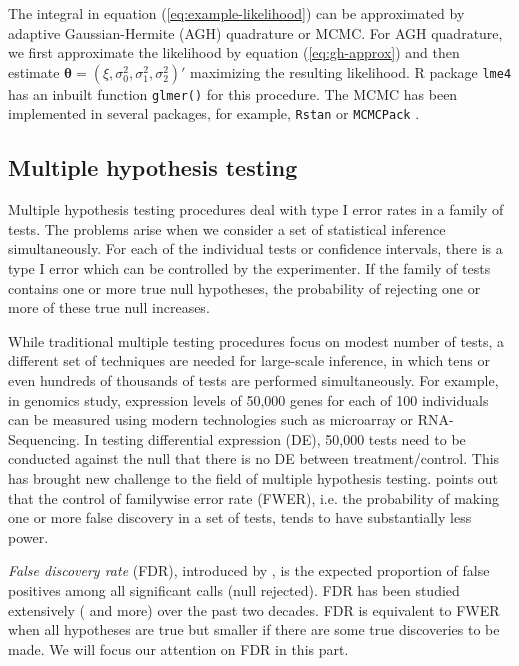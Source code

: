 The integral in equation (\ref{eq:example-likelihood}) can be approximated by adaptive
Gaussian-Hermite (AGH) quadrature or MCMC. For AGH quadrature, we first approximate the likelihood
by equation (\ref{eq:gh-approx}) and then estimate $\bm\theta = (\xi, \sigma_0^2, \sigma_1^2,
\sigma_2^2)'$ maximizing the resulting likelihood. R package \verb"lme4" \citep{bates2012lme4} has
an inbuilt function \verb"glmer()" for this procedure. The MCMC has been implemented in several
packages, for example, \verb|Rstan| \citep{Rstan} or \verb|MCMCPack| \citep{martin2011mcmcpack}. 

\subsection{Multiple hypothesis testing}
Multiple hypothesis testing procedures deal with type I error rates in a family of tests. The
problems arise when we consider a set of statistical inference simultaneously.  For each of the
individual tests or confidence intervals, there is a type I error which can be controlled by the
experimenter.  If the family of tests contains one or more true null hypotheses, the probability of
rejecting one or more of these true null increases. 

While traditional multiple testing procedures focus on modest number of tests, a different set of
techniques are needed for large-scale inference, in which tens or even hundreds of thousands of
tests are performed simultaneously. For example, in genomics study, expression levels of 50,000
genes for each of 100 individuals can be measured using modern technologies such as microarray or
RNA-Sequencing. In testing differential expression (DE), 50,000 tests need to be conducted against
the null that there is no DE between treatment/control. This has brought new challenge to the field
of multiple hypothesis testing. \citet{benjamini1995controlling} points out that the control of
familywise error rate (FWER), i.e. the probability of making one or more false discovery in a set
of
tests, tends to have substantially less power. 

\textit{False discovery rate} (FDR), introduced by \citet{benjamini1995controlling}, is the expected
proportion of false positives among all significant calls (null rejected). FDR has been studied
extensively (\cite{benjamini2001control,efron2004large,efron2010large,storey2003statistical} and
more) over the past two decades.  FDR is equivalent to FWER \citep{benjamini1995controlling} when
all hypotheses are true but smaller if there are some true discoveries to be made. We will focus
our
attention on FDR in this part. 

